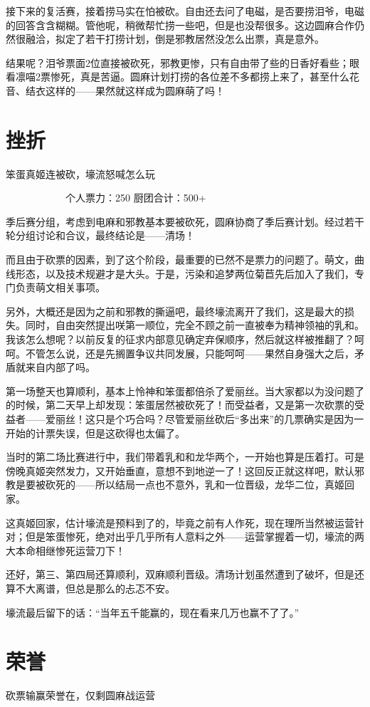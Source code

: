 接下来的复活赛，接着捞马实在怕被砍。自由还去问了电磁，是否要捞泪爷，电磁的回答含含糊糊。管他呢，稍微帮忙捞一些吧，但是也没帮很多。这边圆麻合作仍然很融洽，拟定了若干打捞计划，倒是邪教居然没怎么出票，真是意外。

结果呢？泪爷票面2位直接被砍死，邪教更惨，只有自由带了些的日香好看些；眼看凛喵2票惨死，真是苦逼。圆麻计划打捞的各位差不多都捞上来了，甚至什么花音、结衣这样的——果然就这样成为圆麻萌了吗！


\section{挫折}
笨蛋真姬连被砍，壕流怒喊怎么玩

　　　　　　个人票力：250 厨团合计：500+

季后赛分组，考虑到电麻和邪教基本要被砍死，圆麻协商了季后赛计划。经过若干轮分组讨论和合议，最终结论是——清场！

而且由于砍票的因素，到了这个阶段，最重要的已然不是票力的问题了。萌文，曲线形态，以及技术规避才是大头。于是，污染和追梦两位菊苣先后加入了我们，专门负责萌文相关事项。

另外，大概还是因为之前和邪教的撕逼吧，最终壕流离开了我们，这是最大的损失。同时，自由突然提出咲第一顺位，完全不顾之前一直被奉为精神领袖的乳和。我该怎么想呢？以前反复的征求内部意见确定弃保顺序，然后就这样被推翻了？呵呵。不管怎么说，还是先搁置争议共同发展，只能呵呵——果然自身强大之后，矛盾就来自内部了吗。

第一场整天也算顺利，基本上怜神和笨蛋都倍杀了爱丽丝。当大家都以为没问题了的时候，第二天早上却发现：笨蛋居然被砍死了！而受益者，又是第一次砍票的受益者——爱丽丝！这只是个巧合吗？尽管爱丽丝砍后“多出来”的几票确实是因为一开始的计票失误，但是这砍得也太偏了。

当时的第二场比赛进行中，我们带着乳和和龙华两个，一开始也算是压着打。可是傍晚真姬突然发力，又开始垂直，意想不到地逆一了！这回反正就这样吧，默认邪教是要被砍死的——所以结局一点也不意外，乳和一位晋级，龙华二位，真姬回家。

这真姬回家，估计壕流是预料到了的，毕竟之前有人作死，现在理所当然被运营针对；但是笨蛋惨死，绝对出乎几乎所有人意料之外——运营掌握着一切，壕流的两大本命相继惨死运营刀下！

还好，第三、第四局还算顺利，双麻顺利晋级。清场计划虽然遭到了破坏，但是还算不大离谱，但总是那么的忐忑不安。

壕流最后留下的话：“当年五千能赢的，现在看来几万也赢不了了。”


\section{荣誉}
砍票输赢荣誉在，仅剩圆麻战运营

